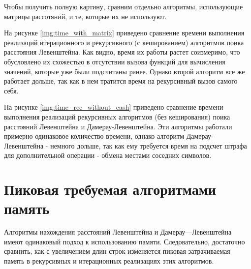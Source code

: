  Чтобы получить полную картину, сравним отдельно алгоритмы, использующие матрицы рассотяний, и те, которые их не используют.
 
 На рисунке \ref{img:time_with_matrix} приведено сравнение времени выполнения реализаций итерационного и рекурсивного (с кешированием) алгоритмов поика расстояния Левенштейна. Как видно, время их работы растет соизмеримо, что обусловлено их схожестью в отсутствии вызова функций для вычисления значений, которые уже были подсчитаны ранее. Однако второй алгоритм все же работает дольше, так как в нем тратится время на рекурсивный вызов самого себя. 
 
 
 На рисунке \ref{img:time_rec_without_cash} приведено сравнение времени выполнения реализаций рекурсивных алгоритмов (без кеширования) поика расстояний Левенштейна и Дамерау-Левенштейна. Эти алгоритмы работали примерно одинаковое количество времени, однако алгоритм Дамерау-Левенштейна - немного дольше, так как ему требуется время на подсчет штрафа для дополнительной операции - обмена местами соседних символов.
 
 
 
 




\section{Пиковая требуемая алгоритмами память}

Алгоритмы нахождения расстояний Левенштейна и Дамерау—Левенштейна имеют одинаковый подход к использованию памяти. Следовательно, достаточно сравнить, как с увеличением длин строк изменяется пиковая затрачиваемая память в рекурсивных и итерационных реализациях этих алгоритмов. 

